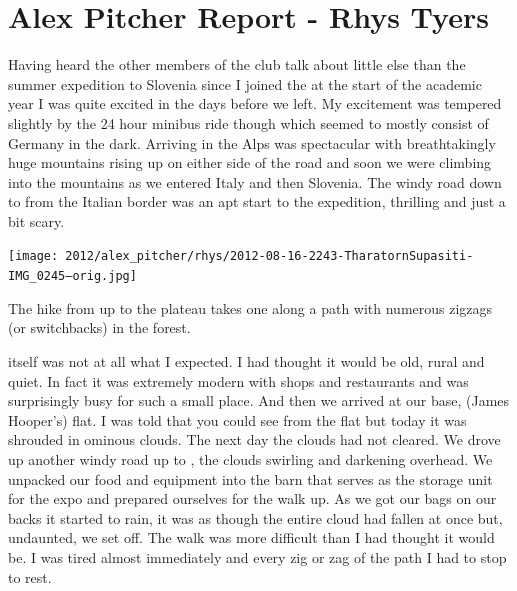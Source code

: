 \section{Alex Pitcher Report - Rhys Tyers}


Having heard the other members of the club talk about little else  than the summer expedition to Slovenia since I joined the at the start of the academic year I was quite excited in the days before we left. My excitement was tempered slightly by the 24 hour minibus ride though which seemed to mostly consist of Germany in the dark. Arriving in the Alps was spectacular with breathtakingly huge mountains rising up on either side of the road and soon we were climbing into the mountains as we entered Italy and then Slovenia. The windy road down to  from the Italian border was an apt start to the expedition, thrilling and just a bit scary.


\begin{pagefigure}
\checkoddpage \ifoddpage \forcerectofloat \else \forceversofloat \fi
   \centering
\texttt{[image: 2012/alex\_pitcher/rhys/2012-08-16-2243-TharatornSupasiti-IMG\_0245--orig.jpg]}
\caption{The hike from  up to the  plateau takes one along a path with numerous zigzags (or switchbacks) in the forest. } \label{forest path}
\end{pagefigure}


 itself was not at all what I expected. I had thought it would be old, rural and quiet. In fact it was extremely modern with shops and restaurants and was surprisingly busy for such a small place. And then we arrived at our  base,  (James Hooper’s) flat. I was told that you could see  from the flat but today it was shrouded in ominous clouds. The next day the clouds had not cleared. We drove up another windy road up to , the clouds swirling and darkening overhead. We unpacked our food and equipment into the barn that serves as the storage unit for the expo and prepared ourselves for the walk up. As we got our bags on our backs it started to rain, it was as though the entire cloud had fallen at once but, undaunted, we set off. The walk was more difficult than I had thought it would be. I was tired almost immediately and every zig or zag of the path I had to stop to rest.

